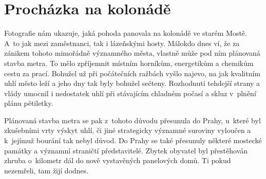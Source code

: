 
\chapter{Procházka na kolonádě}

Fotografie nám ukazuje, jaká pohoda panovala na kolonádě ve starém
Mostě. A~to jak mezi zaměstnanci, tak i lázeňskými hosty. Málokdo dnes
ví, že za zánikem tohoto mimořádně významného města, vlastně může pod
ním plánovaná stavba metra. To mělo zpříjemnit místním horníkům,
energetikům a chemikům cestu za prací. Bohužel už při počátečních
ražbách vyšlo najevo, na jak kvalitním uhlí město leží a jeho dny tak
byly bohužel sečteny. Rozhodnutí tehdejší strany a vlády umocnil i
nedostatek uhlí při stávajícím chladném počasí a skluz v~plnění plánu
pětiletky.

Plánovaná stavba metra se pak z~tohoto důvodu přesunula do Prahy,
u~které byl zkušebními vrty výskyt uhlí, či jiné strategicky významné
suroviny vyloučen a k~jejímuž bourání tak nebyl důvod. Do Prahy se
také přesunuly některé mostecké památky a významní straničtí
představitelé. Zbytek obyvatel byl přestěhován zhruba o~kilometr dál
do nově vystavěných panelových domů. Ti pokud nezemřeli, tam žijí
dodnes.
